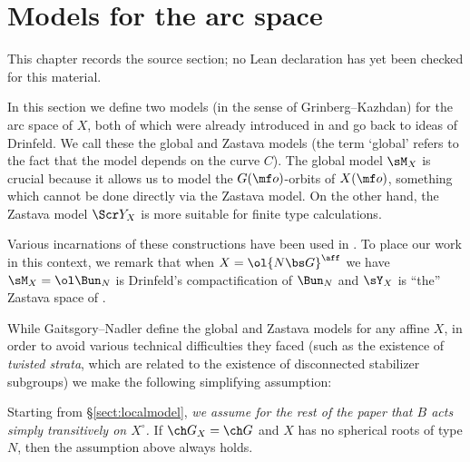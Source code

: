 \chapter{Models for the arc space}
\label{intersection-complexes-unramified-l-factors-chapter-03}

\begin{remark}
\label{intersection-complexes-unramified-l-factors-chapter-03-source}
This chapter records the source section; no Lean declaration has yet been checked for this material.
\notready
\end{remark}

\label{sect:models}

In this section we define two models (in the sense of Grinberg--Kazhdan)
for the arc space of $X$, both of which
were already introduced in \cite{GN} and go back to ideas of Drinfeld.
We call these the global and Zastava models (the term `global' refers to the fact
that the model depends on the curve $C$).
The global model $\sM_X$ is crucial because it allows us to model the $G(\mf o)$-orbits of $X(\mf o)$,
something which cannot be done directly via the Zastava model.
On the other hand, the Zastava model $\Scr Y_X$ is more suitable for finite type calculations.



Various incarnations of these constructions have been used in
\cite{FM,FFKM,BG,BFGM,BFG,ABB}.
To place our work in this context, we remark that when $X = \ol{N\bs G}^\aff$
we have $\sM_X = \ol\Bun_N$ is Drinfeld's compactification of $\Bun_N$
and $\sY_X$ is ``the'' Zastava space of \cite{FM}. %



While Gaitsgory--Nadler define the global and Zastava models for any affine $X$,
in order to avoid various technical difficulties they faced (such as the existence
of \emph{twisted strata}, which are related to the existence of
disconnected stabilizer subgroups) we make the following simplifying assumption:



Starting from \S\ref{sect:localmodel},
\emph{we assume for the rest of the paper that $B$ acts simply transitively on $X^\circ$.}
If $\ch G_X = \ch G$ and $X$ has no spherical roots of type $N$, then the assumption above always holds.



